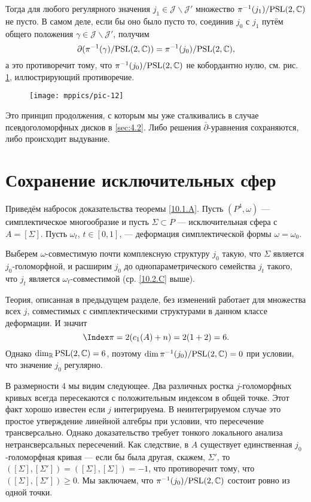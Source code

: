 Тогда для любого регулярного значения $j_1 \in \mathcal{J} \backslash \mathcal{J}'$ множество $\pi^{-1} (j_1)/\mathrm{PSL}(2, \mathbb{C})$ не пусто.
В самом деле, если бы оно было пусто то, соединив $j_0$ с $j_1$ путём общего положения $\gamma \in \mathcal{J} \backslash\mathcal{J}'$, получим
\[\partial(\pi^{-1}(\gamma)/\mathrm{PSL}(2,\mathbb{C}))
=
\pi^{-1}(j_0)/\mathrm{PSL}(2,\mathbb{C}),
\]
а это противоречит тому, что $\pi^{-1} (j_0)/\mathrm{PSL}(2, \mathbb{C})$ не кобордантно нулю, см. рис. \ref{pic-12}, иллюстрирующий противоречие.

\begin{figure}[ht!]
\vskip0mm
\centering
\texttt{[image: mppics/pic-12]}
\caption{}\label{pic-12}
\vskip0mm
\end{figure}

Это  принцип продолжения, с которым мы уже сталкивались в случае псевдоголоморфных дисков в \ref{sec:4.2}.
Либо решения $\bar\partial$-уравнения сохраняются, либо происходит выдувание.

\section{Сохранение исключительных сфер}

Приведём набросок доказательства теоремы \ref{10.1.A}.
Пусть $(P^4, \omega)$ --- симплектическое многообразие и пусть $\Sigma \subset P$ --- исключительная сфера с $A = [\Sigma]$.
Пусть $\omega_t$, $t \in [0, 1]$, --- деформация симплектической формы $\omega = \omega_0$.

Выберем $\omega$-совместимую почти комплексную структуру $j_0$ такую, что $\Sigma$ является $j_0$-голоморфной, и расширим $j_0$ до однопараметрического семейства $j_t$ такого, что $j_t$ является $\omega_t$-совместимой (ср. \ref{10.2.C} выше).

Теория, описанная в предыдущем разделе, без изменений работает для
множества всех $j$, совместимых с симплектическими структурами в
данном классе деформации. 
И значит
\[\Index\pi = 2(c_1 (A) + n) = 2(1 + 2) = 6.\]
Однако $\dim_{\mathbb{R}}\mathrm{PSL}(2, \mathbb{C}) = 6$, поэтому $\dim \pi^{-1}
(j_0)/\mathrm{PSL}(2, \mathbb{C}) = 0$ при условии, что значение $j_0$ регулярно. 

В размерности 4 мы видим следующее.
Два различных ростка $j$-голоморфных кривых всегда пересекаются с
положительным индексом в общей точке. 
Этот факт хорошо известен если $j$ интегрируема.
В неинтегрируемом случае это простое утверждение линейной алгебры при
условии, что пересечение трансверсально. 
Однако доказательство требует тонкого локального анализа
нетрансверсальных пересечений. 
Как следствие, в $A$ существует единственная $j_0$-голоморфная кривая
--- если бы была другая, скажем, $\Sigma'$, то $([\Sigma], [\Sigma'])
= ([\Sigma], [\Sigma]) = -1$, что противоречит тому, что $([\Sigma],
[\Sigma']) \ge 0$. 
Мы заключаем, что $\pi^{-1} (j_0)/\mathrm{PSL}(2, \mathbb{C})$ состоит ровно из одной
точки. 

